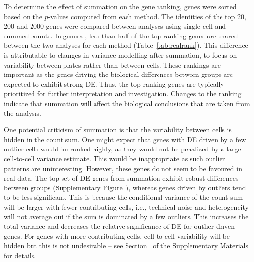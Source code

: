 \documentclass[oupdraft]{bio}
\begin{document}
To determine the effect of summation on the gene ranking, genes were sorted based on the $p$-values computed from each method.
The identities of the top 20, 200 and 2000 genes were compared between analyses using single-cell and summed counts.
In general, less than half of the top-ranking genes are shared between the two analyses for each method (Table~\ref{tab:realrank}).
This difference is attributable to changes in variance modelling after summation, to focus on variability between plates rather than between cells.
These rankings are important as the genes driving the biological differences between groups are expected to exhibit strong DE.
Thus, the top-ranking genes are typically prioritized for further interpretation and investigation.
Changes to the ranking indicate that summation will affect the biological conclusions that are taken from the analysis.

One potential criticism of summation is that the variability between cells is hidden in the count sum.
One might expect that genes with DE driven by a few outlier cells would be ranked highly, as they would not be penalized by a large cell-to-cell variance estimate.
This would be inappropriate as such outlier patterns are uninteresting.
However, these genes do not seem to be favoured in real data.
The top set of DE genes from summation exhibit robust differences between groups (Supplementary Figure~\suppexpprof{}), whereas genes driven by outliers tend to be less significant.
This is because the conditional variance of the count sum will be larger with fewer contributing cells, 
    i.e., technical noise and heterogeneity will not average out if the sum is dominated by a few outliers.
This increases the total variance and decreases the relative significance of DE for outlier-driven genes.
For genes with more contributing cells, cell-to-cell variability will be hidden but this is not undesirable 
    -- see Section~\supphiddenvar{} of the Supplementary Materials for details.

\end{document}

